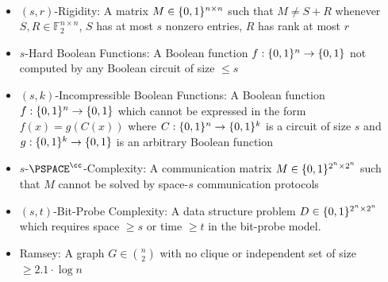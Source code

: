\begin{definition}\label{randomstrings:def:list-of-problems}
~
\begin{itemize}
    \item $(s,r)$-Rigidity: A matrix $M \in \{0,1\}^{n \times n}$ such that $M \neq S + R$ whenever $S,R \in \mathbb{F}_2^{n \times n}$, $S$ has at most $s$ nonzero entries, $R$ has rank at most $r$
    \item $s$-Hard Boolean Functions: A Boolean function $f: \{0,1\}^n \to \{0,1\}$ not computed by any Boolean circuit of size $\leq s$
    \item $(s,k)$-Incompressible Boolean Functions: A Boolean function $f: \{0,1\}^n \to \{0,1\}$ which cannot be expressed in the form $f(x) = g(C(x))$ where $C: \{0,1\}^n \to \{0,1\}^k$ is a circuit of size $s$ and $g: \{0,1\}^k \to \{0,1\}$ is an arbitrary Boolean function
    \item $s$-$\PSPACE^{\cc}$-Complexity: A communication matrix $M \in \{0,1\}^{2^n \times 2^n}$ such that $M$ cannot be solved by space-$s$ communication protocols
    \item $(s,t)$-Bit-Probe Complexity: A data structure problem $D \in \{0,1\}^{2^n \times 2^n}$ which requires space $\geq s$ or time $\geq t$ in the bit-probe model.
    \item Ramsey: A graph $G \in \binom{n}{2}$ with no clique or independent set of size $\geq 2.1 \cdot  \log n$
\end{itemize}
\end{definition}

